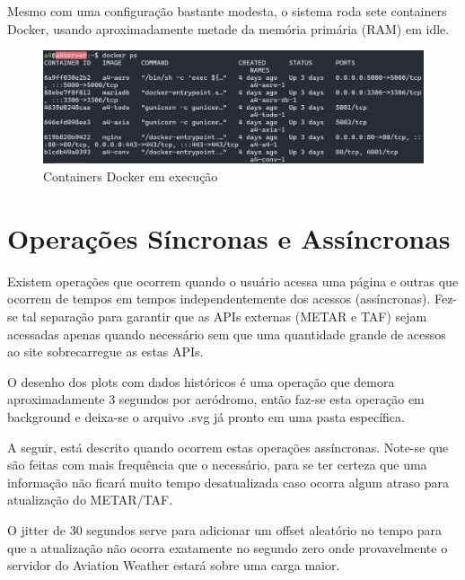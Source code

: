 Mesmo com uma configuração bastante modesta, o sistema roda sete containers Docker, usando 
aproximadamente metade da memória primária (RAM) em idle.

\begin{figure}[ht]
    \begin{center}
    \includegraphics[width=400pt]{img/containers.png}
    \caption{Containers Docker em execução}
    \label{fig:containers}
    \end{center}
\end{figure}

\section{Operações Síncronas e Assíncronas}

Existem operações que ocorrem quando o usuário acessa uma página e outras que
ocorrem de tempos em tempos independentemente dos acessos (assíncronas). Fez-se
tal separação para garantir que as APIs externas (METAR e TAF) sejam acessadas 
apenas quando
necessário sem que uma quantidade grande de acessos ao site sobrecarregue as estas APIs.

O desenho dos plots com dados históricos é uma operação que demora aproximadamente
3 segundos por aeródromo, então faz-se esta operação em background e deixa-se o 
arquivo .svg já pronto em uma pasta específica.

A seguir, está descrito quando ocorrem estas operações assíncronas. Note-se que são
feitas com mais frequência que o necessário, para se ter certeza que uma informação não
ficará muito tempo desatualizada caso ocorra algum atraso para atualização do METAR/TAF.

O jitter de 30 segundos serve para adicionar um offset aleatório no tempo para que
a atualização não ocorra exatamente no segundo zero onde provavelmente o servidor
do Aviation Weather estará sobre uma carga maior.


